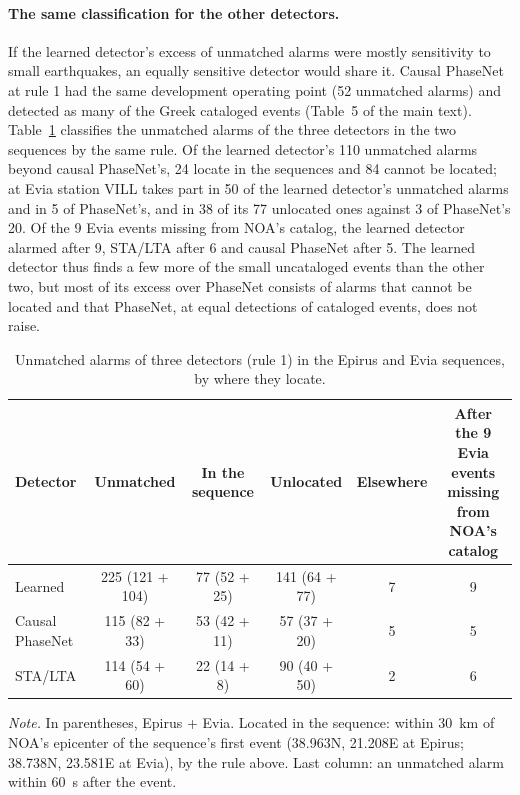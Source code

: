 \documentclass[11pt,a4paper]{article}
\newcommand{\stalta}{STA/LTA}
\newcommand{\tablenote}[1]{\par\vspace{4pt}%
  \begin{minipage}{\linewidth}\footnotesize\textit{Note.} #1
\end{minipage}}
\begin{document}
\paragraph{The same classification for the other detectors.} If the learned
detector's excess of unmatched alarms were mostly sensitivity to small earthquakes,
an equally sensitive detector would share it. Causal PhaseNet at rule 1 had the same
development operating point (52 unmatched alarms) and detected as many of the Greek
cataloged events (Table~5 of the main text). Table~\ref{t:control} classifies the
unmatched alarms of the three detectors in the two sequences by the same rule. Of the
learned detector's 110 unmatched alarms beyond causal PhaseNet's, 24 locate in the
sequences and 84 cannot be located; at Evia station VILL takes part in 50 of the
learned detector's unmatched alarms and in 5 of PhaseNet's, and in 38 of its 77
unlocated ones against 3 of PhaseNet's 20. Of the 9 Evia events
missing from NOA's catalog, the learned detector alarmed after 9, \stalta{} after 6 and
causal PhaseNet after 5. The learned detector thus finds a few more of the small
uncataloged events than the other two, but most of its excess over PhaseNet consists
of alarms that cannot be located and that PhaseNet, at equal detections of cataloged
events, does not raise.

\begin{table}[htbp]
  \centering\footnotesize
  \caption{Unmatched alarms of three detectors (rule 1) in the Epirus and Evia
  sequences, by where they locate.}\label{t:control}
  \setlength{\tabcolsep}{3pt}
  \begin{tabular}{@{}lccccc@{}}
    \toprule
    Detector & Unmatched & In the sequence & Unlocated & Elsewhere & \makecell{After the 9 Evia events\\missing from NOA's catalog} \\
    \midrule
    Learned & 225 (121 + 104) & 77 (52 + 25) & 141 (64 + 77) & 7 & 9 \\
    Causal PhaseNet & 115 (82 + 33) & 53 (42 + 11) & 57 (37 + 20) & 5 & 5 \\
    \stalta{} & 114 (54 + 60) & 22 (14 + 8) & 90 (40 + 50) & 2 & 6 \\
    \bottomrule
  \end{tabular}
  \tablenote{In parentheses, Epirus + Evia. Located in the sequence: within 30~km of
    NOA's epicenter of the sequence's first event (38.963\textdegree N,
    21.208\textdegree E at Epirus; 38.738\textdegree N, 23.581\textdegree E at Evia),
    by the rule above. Last column: an unmatched alarm within 60~s after the event.}
\end{table}
\end{document}
